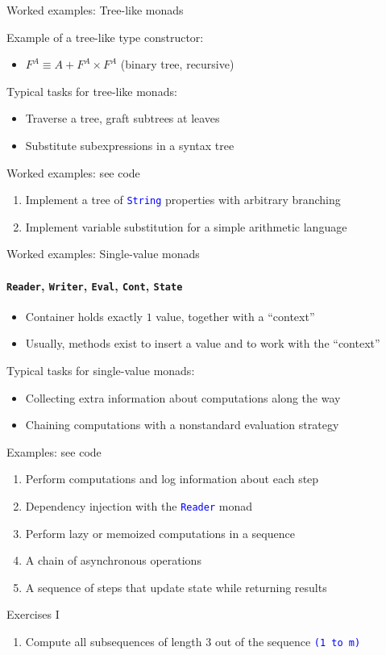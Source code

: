 \documentclass[english]{beamer}
\begin{document}
\begin{frame}{Worked examples: Tree-like monads}

Example of a tree-like type constructor:
\begin{itemize}
\item $F^{A}\equiv A+F^{A}\times F^{A}$ (binary tree, recursive)
\end{itemize}
Typical tasks for tree-like monads:
\begin{itemize}
\item Traverse a tree, graft subtrees at leaves
\item Substitute subexpressions in a syntax tree
\end{itemize}
Worked examples: see code
\begin{enumerate}
\item Implement a tree of \texttt{\textcolor{blue}{\footnotesize{}String}}
properties with arbitrary branching
\item Implement variable substitution for a simple arithmetic language
\end{enumerate}
\end{frame}

\begin{frame}{Worked examples: Single-value monads}


\framesubtitle{\texttt{\footnotesize{}Reader}, \texttt{\footnotesize{}Writer}, \texttt{\footnotesize{}Eval},
\texttt{\footnotesize{}Cont}, \texttt{\footnotesize{}State}}
\begin{itemize}
\item Container holds exactly $1$ value, together with a ``context''
\item Usually, methods exist to insert a value and to work with the ``context''
\end{itemize}
Typical tasks for single-value monads:
\begin{itemize}
\item Collecting extra information about computations along the way
\item Chaining computations with a nonstandard evaluation strategy
\end{itemize}
Examples: see code
\begin{enumerate}
\item Perform computations and log information about each step
\item Dependency injection with the \texttt{\textcolor{blue}{\footnotesize{}Reader}}
monad
\item Perform lazy or memoized computations in a sequence
\item A chain of asynchronous operations
\item A sequence of steps that update state while returning results
\end{enumerate}
\end{frame}

\begin{frame}{Exercises I}
\begin{enumerate}
\item Compute all subsequences of length 3 out of the sequence \texttt{\textcolor{blue}{\footnotesize{}(1
to m)}} 
\end{enumerate}
\end{frame}
\end{document}

